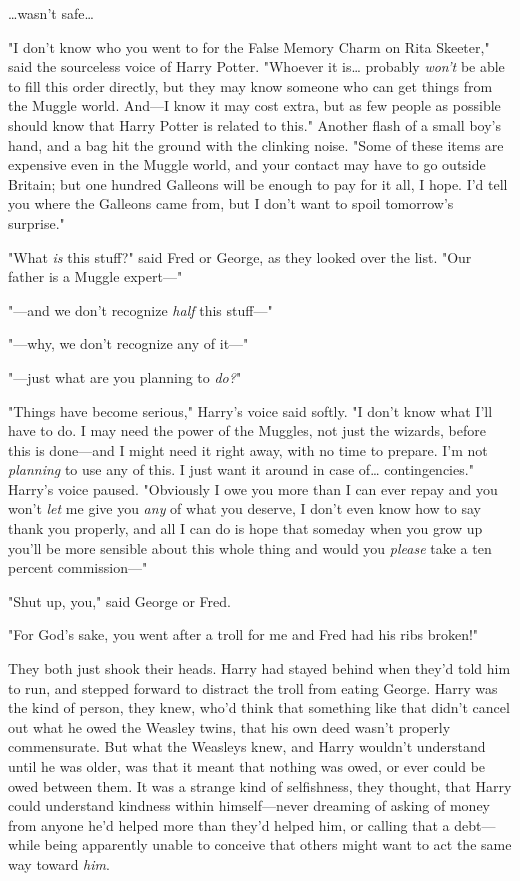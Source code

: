 {\ldots}wasn't safe{\ldots}

"I don't know who you went to for the False Memory Charm on Rita Skeeter," said
the sourceless voice of Harry Potter. "Whoever it is{\ldots} probably
\emph{won't} be able to fill this order directly, but they may know someone who
can get things from the Muggle world. And---I know it may cost extra, but as
few people as possible should know that Harry Potter is related to this."
Another flash of a small boy's hand, and a bag hit the ground with the clinking
noise. "Some of these items are expensive even in the Muggle world, and your
contact may have to go outside Britain; but one hundred Galleons will be enough
to pay for it all, I hope. I'd tell you where the Galleons came from, but I
don't want to spoil tomorrow's surprise."

"What \emph{is} this stuff?" said Fred or George, as they looked over the list.
"Our father is a Muggle expert---"

"---and we don't recognize \emph{half} this stuff---"

"---why, we don't recognize any of it---"

"---just what are you planning to \emph{do?}"

"Things have become serious," Harry's voice said softly. "I don't know what
I'll have to do. I may need the power of the Muggles, not just the wizards,
before this is done---and I might need it right away, with no time to prepare.
I'm not \emph{planning} to use any of this. I just want it around in case
of{\ldots} contingencies." Harry's voice paused. "Obviously I owe you more than
I can ever repay and you won't \emph{let} me give you \emph{any} of what you
deserve, I don't even know how to say thank you properly, and all I can do is
hope that someday when you grow up you'll be more sensible about this whole
thing and would you \emph{please} take a ten percent commission---"

"Shut up, you," said George or Fred.

"For God's sake, you went after a troll for me and Fred had his ribs broken!"

They both just shook their heads. Harry had stayed behind when they'd told him
to run, and stepped forward to distract the troll from eating George. Harry was
the kind of person, they knew, who'd think that something like that didn't
cancel out what he owed the Weasley twins, that his own deed wasn't properly
commensurate. But what the Weasleys knew, and Harry wouldn't understand until
he was older, was that it meant that nothing was owed, or ever could be owed
between them. It was a strange kind of selfishness, they thought, that Harry
could understand kindness within himself---never dreaming of asking of money
from anyone he'd helped more than they'd helped him, or calling that a
debt---while being apparently unable to conceive that others might want to act
the same way toward \emph{him}.

